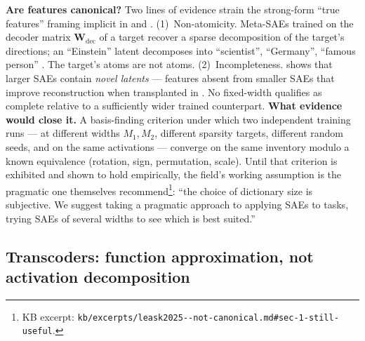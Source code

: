\begin{contradiction}
\textbf{Are  features canonical?} Two lines of evidence strain the
strong-form ``true features'' framing implicit in
\citet{bricken2023-monosemanticity} and
\citet{templeton2024-scaling-monosemanticity}.
\textsf{(1)~Non-atomicity.} Meta-SAEs trained on the decoder matrix
$\mathbf{W}_\text{dec}$ of a target  recover a sparse decomposition
of the target's  directions; an ``Einstein'' latent decomposes
into ``scientist'', ``Germany'', ``famous person''
\citep[\S 1]{leask2025-sae-not-canonical}. The target's atoms are not
atoms.
\textsf{(2)~Incompleteness.}  shows that larger SAEs
contain \emph{novel latents} --- features absent from smaller SAEs
that improve reconstruction when transplanted in
\citep[abstract]{leask2025-sae-not-canonical}. No fixed-width 
qualifies as complete relative to a sufficiently wider trained
counterpart.
\textbf{What evidence would close it.} A basis-finding criterion under
which two independent  training runs --- at different widths
$M_1, M_2$, different sparsity targets, different random seeds, and
on the same activations --- converge on the same  inventory
modulo a known equivalence (rotation, sign, permutation, scale).
Until that criterion is exhibited and shown to hold empirically, the
field's working assumption is the pragmatic one
\citet[\S 1]{leask2025-sae-not-canonical} themselves
recommend\footnote{KB excerpt:
\texttt{kb/excerpts/leask2025--not-canonical.md\#sec-1-still-useful}.}:
``the choice of dictionary size is subjective. We suggest taking a
pragmatic approach to applying SAEs to 
tasks, trying SAEs of several widths to see which is best
suited.''~\citep[\S 1]{leask2025-sae-not-canonical}
\end{contradiction}

\subsection{Transcoders: function approximation, not activation
decomposition}
\label{sec:transcoder-canonicality}

